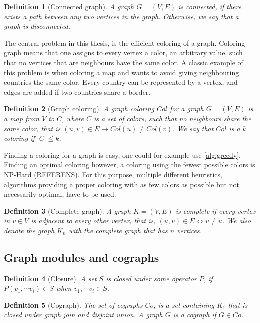 \documentclass{amsart}
\newtheorem{definition}{Definition}[section]
\begin{document}
\begin{definition}[Connected graph]
    A graph $G = (V,E)$ is connected, if there exists a path between any two
    vertices in the graph. Otherwise, we say that a graph is disconnected.
\end{definition}

The central problem in this thesis, is the efficient coloring of a graph.
Coloring graph means that one assigns to every vertex a color, an arbitrary
value, such that no vertices that are neighbours have the same color. A classic
example of this problem is when coloring a map and wants to avoid giving
neighbouring countries the same color.  Every country can be represented by a
vertex, and edges are added if two countries share a border.

\begin{definition}[Graph coloring]
    A graph coloring $Col$ for a graph $G = (V,E)$ is a map from $V$ to $C$,
    where $C$ is a set of colors, such that no neighbours share the same color,
    that is $(u,v) \in E \to Col(u) \neq Col(v)$. We say that $Col$
    is a $k$ coloring if $|C| \leq k$.
\end{definition}

Finding a coloring for a graph is easy, one could for example use
\autoref{alg:greedy}. Finding an optimal coloring however, a coloring using the
fewest possible colors is NP-Hard (REFERENS). For this purpose, multiple
different heuristics, algorithms providing a proper coloring with as few colors
as possible but not necessarily optimal, have to be used.


\begin{definition}[Complete graph]
    A graph $K = (V,E)$ is complete if every vertex in $v \in V$ is adjacent to
    every other vertex, that is, $ (u,v) \in E \iff v \neq u$. We also denote the graph $K_n$ with the complete graph that
    has $n$ vertices.
\end{definition}

\subsection{Graph modules and cographs}
\label{sec:GraphModules}

\begin{definition}[Closure]
    A set $S$ is closed under some operator $P$, if 
    $ P(v_1,\cdots v_i) \in S$ when $v_1,\cdots v_i \in S$.
\end{definition}

\begin{definition}[Cograph]
    The set of cographs $Co$, is a set containing $K_1$ that is closed under 
    graph join and disjoint union. A graph $G$ is a cograph if $G \in Co$.
\end{definition}
\end{document}
